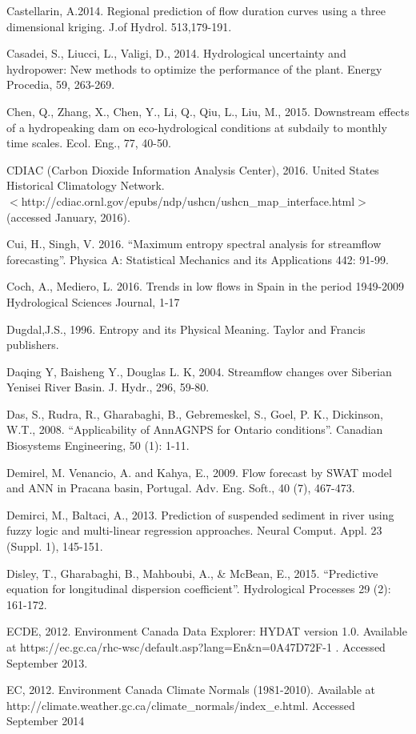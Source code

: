 \begin{hangingpar}{2em}
Castellarin, A.2014. Regional prediction of flow duration curves using a three dimensional kriging. J.of Hydrol. 513,179-191. 

Casadei, S., Liucci, L., Valigi, D., 2014. Hydrological uncertainty and hydropower: New methods to optimize the performance of the plant.  Energy Procedia, 59, 263-269.

Chen, Q., Zhang, X., Chen, Y., Li, Q., Qiu, L., Liu, M., 2015. Downstream effects of a hydropeaking dam on eco-hydrological conditions at subdaily to monthly time scales. Ecol. Eng., 77, 40-50.

CDIAC (Carbon Dioxide Information Analysis Center), 2016. United States Historical Climatology Network.\\ $<$http://cdiac.ornl.gov/epubs/ndp/ushcn/ushcn\_map\_interface.html$>$ (accessed January, 2016).

Cui, H., Singh, V. 2016. ``Maximum entropy spectral analysis for streamflow forecasting''. Physica A: Statistical Mechanics and its Applications 442: 91-99.

Coch, A., Mediero, L.	2016. Trends in low flows in Spain in the period 1949-2009		Hydrological Sciences Journal, 1-17

Dugdal,J.S., 1996. Entropy and its Physical Meaning. Taylor and Francis publishers.

Daqing Y, Baisheng Y., Douglas L. K, 2004. Streamflow changes over Siberian Yenisei River Basin. J.  Hydr., 296, 59-80.

Das, S., Rudra, R., Gharabaghi, B., Gebremeskel, S., Goel, P. K., Dickinson, W.T., 2008.  ``Applicability of AnnAGNPS for Ontario conditions''.   Canadian Biosystems Engineering, 50 (1): 1-11.

Demirel, M. Venancio, A. and Kahya, E., 2009. Flow forecast by SWAT model and ANN in Pracana basin, Portugal.  Adv. Eng. Soft., 40 (7), 467-473.

Demirci, M., Baltaci, A., 2013. Prediction of suspended sediment in river using fuzzy logic and multi-linear regression approaches. Neural Comput. Appl. 23 (Suppl. 1), 145-151.

Disley, T., Gharabaghi, B., Mahboubi, A., \& McBean, E., 2015.  ``Predictive equation for longitudinal dispersion coefficient''.   Hydrological Processes 29 (2): 161-172.

ECDE, 2012. Environment Canada Data Explorer: HYDAT version 1.0. Available at https://ec.gc.ca/rhc-wsc/default.asp?lang=En\&n=0A47D72F-1 . Accessed September 2013.

EC, 2012. Environment Canada Climate Normals (1981-2010). Available at \\http://climate.weather.gc.ca/climate\_normals/index\_e.html. Accessed September 2014


\end{hangingpar}
